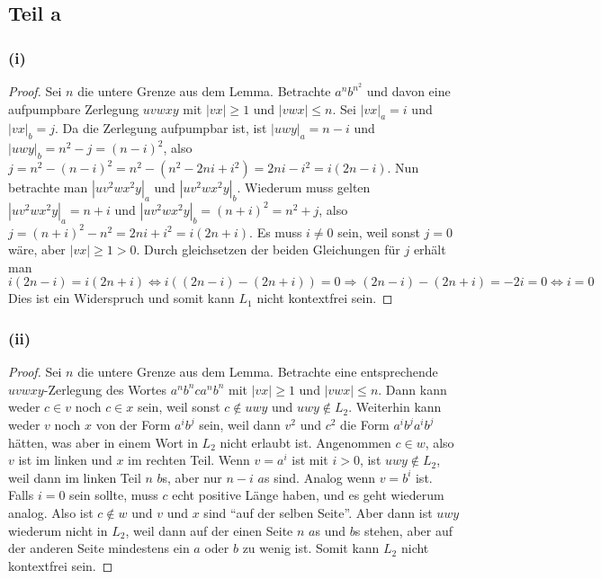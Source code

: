 \documentclass[10pt,a4paper]{article}
\begin{document}
\subsection{Teil a}

\subsubsection{(i)}

\begin{proof}
  Sei $n$ die untere Grenze aus dem Lemma.
  Betrachte $a^{n}b^{n^{2}}$ und davon eine aufpumpbare Zerlegung $uvwxy$ mit $|vx| \ge 1$ und $|vwx| \le n$.
  Sei $|vx|_{a} = i$ und $|vx|_{b} = j$.
  Da die Zerlegung aufpumpbar ist, ist $|uwy|_{a} = n - i$ und $|uwy|_{b} = n^{2} - j = (n - i)^{2}$, also $j = n^{2} - (n - i)^{2} = n^{2} - (n^{2} - 2ni + i^{2}) = 2ni - i^{2} = i(2n - i)$.
  Nun betrachte man $|uv^{2}wx^{2}y|_{a}$ und $|uv^{2}wx^{2}y|_{b}$.
  Wiederum muss gelten $|uv^{2}wx^{2}y|_{a} = n + i$ und $|uv^{2}wx^{2}y|_{b} = (n + i)^{2} = n^{2} + j$, also $j = (n + i)^{2} - n^{2} = 2ni + i^{2} = i(2n + i)$.
  Es muss $i \ne 0$ sein, weil sonst $j = 0$ wäre, aber $|vx| \ge 1 > 0$.
  Durch gleichsetzen der beiden Gleichungen für $j$ erhält man
  \begin{equation}
    i(2n - i) = i(2n + i) \Leftrightarrow i((2n - i) - (2n + i)) = 0 \Rightarrow (2n - i) - (2n + i) = -2i = 0 \Leftrightarrow i = 0
  \end{equation}
  Dies ist ein Widerspruch und somit kann $L_{1}$ nicht kontextfrei sein.
\end{proof}

\subsubsection{(ii)}

\begin{proof}
  Sei $n$ die untere Grenze aus dem Lemma.
  Betrachte eine entsprechende $uvwxy$-Zerlegung des Wortes $a^{n}b^{n}ca^{n}b^{n}$ mit $|vx| \ge 1$ und $|vwx| \le n$.
  Dann kann weder $c \in v$ noch $c \in x$ sein, weil sonst $c \not\in uwy$ und $uwy \not\in L_{2}$.
  Weiterhin kann weder $v$ noch $x$ von der Form $a^{i}b^{j}$ sein, weil dann $v^{2}$ und $c^{2}$ die Form $a^{i}b^{j}a^{i}b^{j}$ hätten, was aber in einem Wort in $L_{2}$ nicht erlaubt ist.
  Angenommen $c \in w$, also $v$ ist im linken und $x$ im rechten Teil.
  Wenn $v = a^{i}$ ist mit $i > 0$, ist $uwy \not\in L_{2}$, weil dann im linken Teil $n$ $b$s, aber nur $n - i$ $a$s sind.
  Analog wenn $v = b^{i}$ ist.
  Falls $i = 0$ sein sollte, muss $c$ echt positive Länge haben, und es geht wiederum analog.
  Also ist $c \not\in w$ und $v$ und $x$ sind ``auf der selben Seite''.
  Aber dann ist $uwy$ wiederum nicht in $L_{2}$, weil dann auf der einen Seite $n$ $a$s und $b$s stehen, aber auf der anderen Seite mindestens ein $a$ oder $b$ zu wenig ist.
  Somit kann $L_{2}$ nicht kontextfrei sein.
\end{proof}
\end{document}
